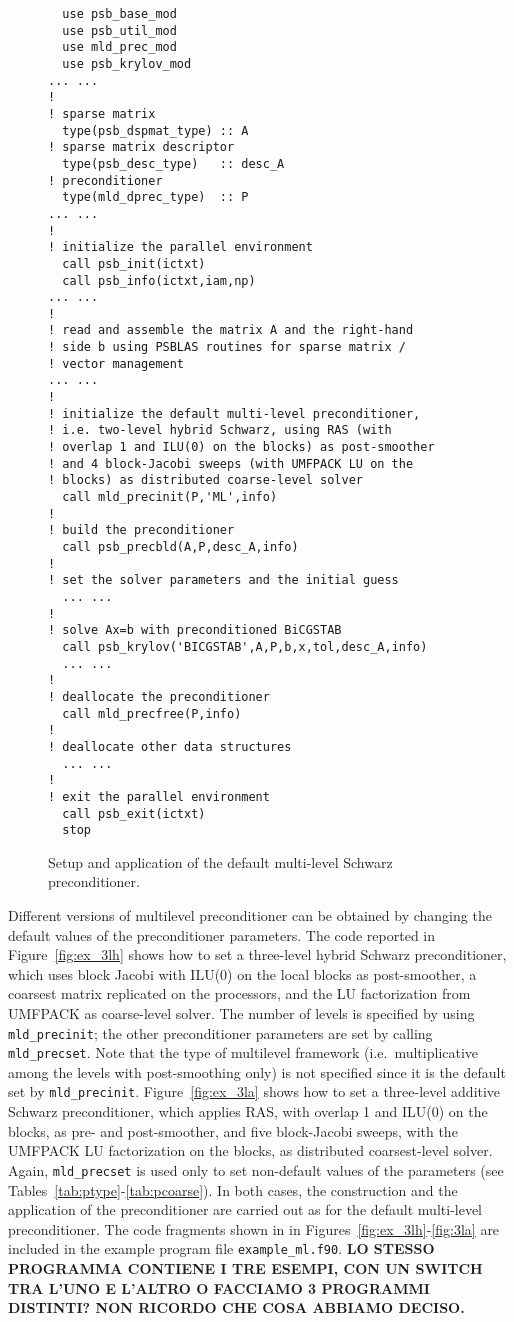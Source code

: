 \begin{figure}[tbp]
\begin{center}
{\small
\begin{verbatim}
  use psb_base_mod
  use psb_util_mod 
  use mld_prec_mod
  use psb_krylov_mod
... ...
!
! sparse matrix
  type(psb_dspmat_type) :: A
! sparse matrix descriptor
  type(psb_desc_type)   :: desc_A
! preconditioner
  type(mld_dprec_type)  :: P
... ...
!
! initialize the parallel environment
  call psb_init(ictxt)
  call psb_info(ictxt,iam,np)
... ...
!
! read and assemble the matrix A and the right-hand
! side b using PSBLAS routines for sparse matrix /
! vector management
... ...
!
! initialize the default multi-level preconditioner,
! i.e. two-level hybrid Schwarz, using RAS (with
! overlap 1 and ILU(0) on the blocks) as post-smoother
! and 4 block-Jacobi sweeps (with UMFPACK LU on the
! blocks) as distributed coarse-level solver
  call mld_precinit(P,'ML',info)
!
! build the preconditioner
  call psb_precbld(A,P,desc_A,info)
!
! set the solver parameters and the initial guess
  ... ...
!
! solve Ax=b with preconditioned BiCGSTAB
  call psb_krylov('BICGSTAB',A,P,b,x,tol,desc_A,info)
  ... ...
!
! deallocate the preconditioner
  call mld_precfree(P,info)
!
! deallocate other data structures
  ... ...
!
! exit the parallel environment
  call psb_exit(ictxt)
  stop
\end{verbatim}
}
\caption{Setup and application of the default multi-level Schwarz preconditioner.
\label{fig:ex_default}}
\end{center}
\end{figure}

Different versions of multilevel preconditioner can be obtained by changing
the default values of the preconditioner parameters. The code reported in
Figure~\ref{fig:ex_3lh} shows how to set a three-level hybrid Schwarz
preconditioner, which uses block Jacobi with ILU(0) on the
local blocks as post-smoother, a coarsest matrix replicated on the processors,
and the LU factorization from UMFPACK as coarse-level solver.
The number of levels is specified by using \verb|mld_precinit|; the other
preconditioner parameters are set by calling \verb|mld_precset|. Note that
the type of multilevel framework (i.e.\ multiplicative among the levels
with post-smoothing only) is not specified since it is the default 
set by \verb|mld_precinit|. Figure~\ref{fig:ex_3la} shows how to
set a three-level additive Schwarz preconditioner,
which applies RAS, with overlap 1 and ILU(0) on the blocks,
as pre- and post-smoother, and five block-Jacobi sweeps, with
the UMFPACK LU factorization on the blocks, as distributed coarsest-level
solver. Again, \verb|mld_precset| is used only to set
non-default values of the parameters (see Tables~\ref{tab:ptype}-\ref{tab:pcoarse}).
In both cases, the construction and the application of the preconditioner
are carried out as for the default multi-level preconditioner.
The code fragments shown in in Figures~\ref{fig:ex_3lh}-\ref{fig:3la} are
included in the example program file \verb|example_ml.f90|.
\textbf{LO STESSO PROGRAMMA CONTIENE I TRE ESEMPI, CON UN SWITCH TRA L'UNO E L'ALTRO
O FACCIAMO 3 PROGRAMMI DISTINTI? NON RICORDO CHE COSA ABBIAMO DECISO.}

